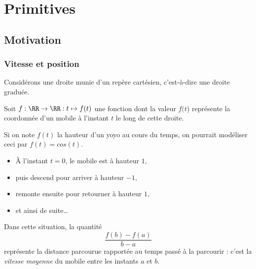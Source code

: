 \section{Primitives}
\subsection{Motivation}
\subsubsection{Vitesse et position}
\begin{frame}\pause{}%
  Considérons une droite munie d'un repère cartésien, c'est-à-dire une droite graduée.\pause{}

  Soit \(f : \RR \to \RR : t \mapsto f(t)\) une fonction dont la valeur \(f(t\)) représente la coordonnée d'un mobile à l'instant \(t\) le long de cette droite.

  \begin{example}\pause{}
    Si on note \(f(t)\) la hauteur d'un yoyo au cours du temps, on pourrait modéliser ceci par \(f(t) = cos(t)\).\pause{}
    \begin{itemize}[<+->]
    \item À l'instant \(t = 0\), le mobile est à hauteur \(1\),
    \item puis descend pour arriver à hauteur \(-1\),
    \item remonte ensuite pour retourner à hauteur \(1\),
    \item et ainsi de suite\dots{}
    \end{itemize}
  \end{example}\pause{}

  Dans cette situation, la quantité
  \begin{equation*}
    \frac{f(b)-f(a)}{b-a}
  \end{equation*}
  représente\pause{} la distance parcourue\pause{} rapportée au temps passé à la parcourir\pause{} : c'est la \emph{vitesse moyenne} du mobile entre les instants \(a\) et \(b\).
\end{frame}
